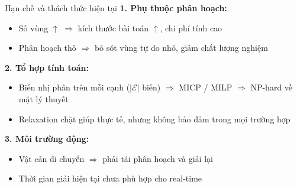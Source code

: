 \documentclass[aspectratio=169]{beamer}
\begin{document}
\begin{frame}{Hạn chế và thách thức hiện tại}
    \textbf{1. Phụ thuộc phân hoạch:}
    \begin{itemize}
        \item Số vùng $\uparrow$ $\Rightarrow$ kích thước bài toán $\uparrow$, chi phí tính
              cao
        \item Phân hoạch thô $\Rightarrow$ bỏ sót vùng tự do nhỏ, giảm chất lượng nghiệm
    \end{itemize}

    \vspace{0.3em}
    \textbf{2. Tổ hợp tính toán:}
    \begin{itemize}
        \item Biến nhị phân trên mỗi cạnh ($|\mathcal{E}|$ biến) $\Rightarrow$ MICP / MILP
              $\Rightarrow$ NP-hard về mặt lý thuyết
        \item Relaxation chặt giúp thực tế, nhưng không bảo đảm trong mọi trường hợp
    \end{itemize}

    \vspace{0.3em}
    \textbf{3. Môi trường động:}
    \begin{itemize}
        \item Vật cản di chuyển $\Rightarrow$ phải tái phân hoạch và giải lại
        \item Thời gian giải hiện tại chưa phù hợp cho real-time
    \end{itemize}
\end{frame}


\end{document}
